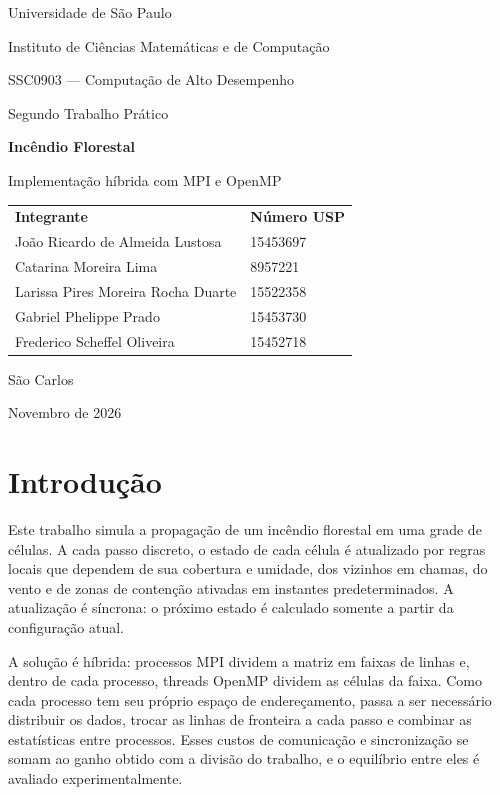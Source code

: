 \documentclass[11pt,a4paper]{article}
\begin{document}
\begin{titlepage}
\centering
{\large Universidade de São Paulo\par}
{\large Instituto de Ciências Matemáticas e de Computação\par}
\vspace{1cm}
{\large SSC0903 --- Computação de Alto Desempenho\par}
{\large Segundo Trabalho Prático\par}
\vfill
{\LARGE\bfseries Incêndio Florestal\par}
\vspace{0.5cm}
{\Large Implementação híbrida com MPI e OpenMP\par}
\vfill
\begin{tabular}{ll}
\textbf{Integrante} & \textbf{Número USP} \\
João Ricardo de Almeida Lustosa & 15453697 \\
Catarina Moreira Lima & 8957221 \\
Larissa Pires Moreira Rocha Duarte & 15522358 \\
Gabriel Phelippe Prado & 15453730 \\
Frederico Scheffel Oliveira & 15452718\\
\end{tabular}
\vfill
São Carlos\par
Novembro de 2026
\end{titlepage}
\tableofcontents
\newpage


\section{Introdução}

Este trabalho simula a propagação de um incêndio florestal em uma grade de
células. A cada passo discreto, o estado de cada célula é atualizado por
regras locais que dependem de sua cobertura e umidade, dos vizinhos em
chamas, do vento e de zonas de contenção ativadas em instantes
predeterminados. A atualização é síncrona: o próximo estado é calculado
somente a partir da configuração atual.

A solução é híbrida: processos MPI dividem a matriz
em faixas de linhas e, dentro de cada processo, threads OpenMP dividem as
células da faixa. Como cada processo tem seu próprio espaço de endereçamento,
passa a ser necessário distribuir os dados, trocar as linhas de fronteira a
cada passo e combinar as estatísticas entre processos. Esses custos de
comunicação e sincronização se somam ao ganho obtido com a divisão do
trabalho, e o equilíbrio entre eles é avaliado experimentalmente.
\end{document}
